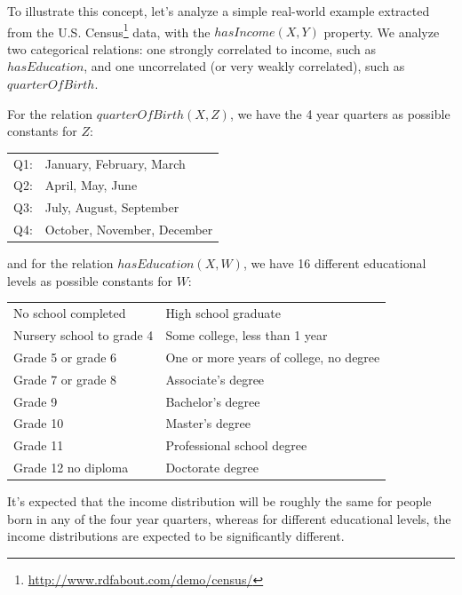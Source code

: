 To illustrate this concept, let's analyze a simple real-world example extracted from the U.S.
Census\footnote{\url{http://www.rdfabout.com/demo/census/}} data, with the $hasIncome(X,Y)$ property. We analyze two
categorical relations: one strongly correlated to income, such as $hasEducation$, and one uncorrelated (or very
weakly correlated), such as $quarterOfBirth$.

For the relation $quarterOfBirth(X,Z)$, we have the 4 year quarters as possible constants for $Z$:

\begin{center}
  \begin{tabular}{r l}
    Q1:& January, February, March \\
    Q2:& April, May, June \\
    Q3:& July, August, September \\
    Q4:& October, November, December \\
  \end{tabular}
\end{center}

and for the relation $hasEducation(X,W)$, we have 16 different educational levels as possible constants for $W$:

\begin{center}
  \begin{tabular}{l l}
    	
    No school completed			&High school graduate                 		\\
    Nursery school to grade 4   	&Some college, less than 1 year			\\
    Grade 5 or grade 6          	&One or more years of college, no degree	\\
    Grade 7 or grade 8          	&Associate's degree				\\
    Grade 9                     	&Bachelor's degree				\\
    Grade 10                    	&Master's degree				\\
    Grade 11                    	&Professional school degree			\\
    Grade 12 no diploma 		&Doctorate degree				\\
  \end{tabular}
\end{center}

It's expected that the income distribution will be roughly the same for people born in any of the four year quarters,
whereas for different educational levels, the income distributions are
expected to be significantly different. 

